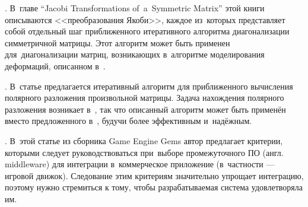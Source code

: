 \documentclass[a4paper,11pt]{report}
\begin{document}
    \cite[Numerical Recipes...]{fortran-jacobi}. В~главе {\English ``Jacobi Transformations
      of~a~Symmetric Matrix''} этой книги описываются <<преобразования Якоби>>, каждое из~которых
      представляет собой отдельный шаг приближенного итеративного алгоритма диагонализации
      симметричной матрицы. Этот алгоритм может быть применен для~диагонализации матриц, возникающих
      в~алгоритме моделирования деформаций, описанном в~\cite{muller-meshless}.

    \cite[Frobenius Iteration for the Matrix Polar Decomposition]{hp-polar}. В~статье
      предлагается итеративный алгоритм для приближенного вычисления полярного разложения
      произвольной матрицы. Задача нахождения полярного разложения возникает в~\cite{muller-meshless},
      так что описанный алгоритм может быть применён вместо предложенного в~\cite{muller-meshless},
      будучи более эффективным и~надёжным.

    \cite[What to Look for When Evaluating Middleware for Integration]{gems-middleware}.
      В~этой статье из сборника {\English Game Engine Gems} автор предлагает критерии, которыми
      следует руководствоваться при~выборе промежуточного ПО (англ. {\English middleware}) для интеграции
      в~коммерческое приложение (в~частности --- игровой движок). Следование этим критериям
      значительно упрощает интеграцию, поэтому нужно стремиться к тому, чтобы разрабатываемая
      система удовлетворяла им.
\end{document}
